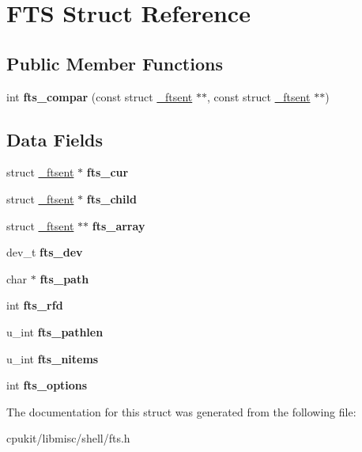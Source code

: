 \hypertarget{structFTS}{}\section{F\+TS Struct Reference}
\label{structFTS}
\subsection*{Public Member Functions}
\begin{DoxyCompactItemize}
\item 
\mbox{\label{structFTS_a9f6de446c9ca84151c9af787b73039dd}} 
int {\bfseries fts\+\_\+compar} (const struct \mbox{\hyperlink{struct__ftsent}{\+\_\+ftsent}} $\ast$$\ast$, const struct \mbox{\hyperlink{struct__ftsent}{\+\_\+ftsent}} $\ast$$\ast$)
\end{DoxyCompactItemize}
\subsection*{Data Fields}
\begin{DoxyCompactItemize}
\item 
\mbox{\label{structFTS_a08ecc2deb063af1798129d9313546826}} 
struct \mbox{\hyperlink{struct__ftsent}{\+\_\+ftsent}} $\ast$ {\bfseries fts\+\_\+cur}
\item 
\mbox{\label{structFTS_a9f171b866eb11d48d7da97257745fc13}} 
struct \mbox{\hyperlink{struct__ftsent}{\+\_\+ftsent}} $\ast$ {\bfseries fts\+\_\+child}
\item 
\mbox{\label{structFTS_a53df707bc19d57beb6e62bc367926d06}} 
struct \mbox{\hyperlink{struct__ftsent}{\+\_\+ftsent}} $\ast$$\ast$ {\bfseries fts\+\_\+array}
\item 
\mbox{\label{structFTS_aa3c11f29f2bbc6b9e94210d64c3b4186}} 
dev\+\_\+t {\bfseries fts\+\_\+dev}
\item 
\mbox{\label{structFTS_ad926a226b225fc21c7808f880649be5d}} 
char $\ast$ {\bfseries fts\+\_\+path}
\item 
\mbox{\label{structFTS_a3a5fc5f85de1c28beaed4c39d7679412}} 
int {\bfseries fts\+\_\+rfd}
\item 
\mbox{\label{structFTS_a19dd88a0a85f1b273aa38a9d36459dbb}} 
u\+\_\+int {\bfseries fts\+\_\+pathlen}
\item 
\mbox{\label{structFTS_a02d3167f62044f9b98e571478ceed457}} 
u\+\_\+int {\bfseries fts\+\_\+nitems}
\item 
\mbox{\label{structFTS_ab92db932926b32e5f727745c8e9fb26d}} 
int {\bfseries fts\+\_\+options}
\end{DoxyCompactItemize}


The documentation for this struct was generated from the following file\+:\begin{DoxyCompactItemize}
\item 
cpukit/libmisc/shell/fts.\+h\end{DoxyCompactItemize}
